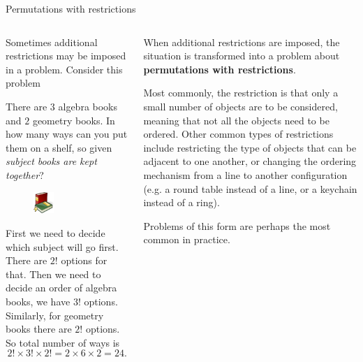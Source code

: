 \documentclass[9pt,aspectratio=169]{beamer}
\begin{document}
\begin{frame}{Permutations with restrictions}
  \begin{columns}[T]
    \begin{column}{0.5\textwidth}
      Sometimes additional restrictions may be imposed in a problem. Consider this problem
      \begin{problem}
        There are $3$ algebra books and $2$ geometry books. In how many ways can you put them on a shelf, so given \emph{subject books are kept together}?        
      \end{problem}
      \begin{figure}\centering
        \includegraphics[width=0.3\textwidth]{02 - Combinatorics 101/books.png}
      \end{figure}

      First we need to decide which subject will go first. There are $2!$ options for that. Then we need to decide an order of algebra books, we have $3!$ options. Similarly, for geometry books there are $2!$ options. So total number of ways is
      \[
        2! \times 3! \times 2! = 2 \times 6 \times 2 = 24.
      \]
    \end{column}
    \begin{column}{0.5\textwidth}
      When additional restrictions are imposed, the situation is transformed into a problem about \textbf{permutations with restrictions}.\medskip

      Most commonly, the restriction is that only a small number of objects are to be considered, meaning that not all the objects need to be ordered. Other common types of restrictions include restricting the type of objects that can be adjacent to one another, or changing the ordering mechanism from a line to another configuration (e.g. a round table instead of a line, or a keychain instead of a ring).\medskip

      Problems of this form are perhaps the most common in practice.

    \end{column}
  \end{columns}
\end{frame}
\end{document}
